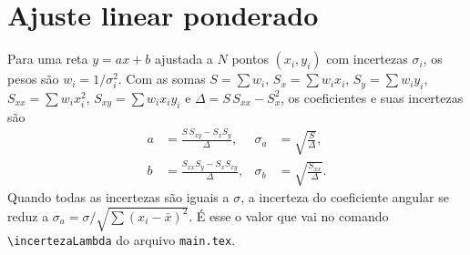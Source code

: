\chapter{Ajuste linear ponderado}
\label{ap:ajuste}

Para uma reta $y = a x + b$ ajustada a $N$ pontos $(x_i, y_i)$ com incertezas $\sigma_i$, os pesos são $w_i = 1/\sigma_i^2$. Com as somas $S = \sum w_i$, $S_x = \sum w_i x_i$, $S_y = \sum w_i y_i$, $S_{xx} = \sum w_i x_i^2$, $S_{xy} = \sum w_i x_i y_i$ e $\Delta = S\,S_{xx} - S_x^2$, os coeficientes e suas incertezas são \cite{taylor1997}
\begin{align}
  a &= \frac{S\,S_{xy} - S_x S_y}{\Delta}, & \sigma_a &= \sqrt{\frac{S}{\Delta}}, \\
  b &= \frac{S_{xx} S_y - S_x S_{xy}}{\Delta}, & \sigma_b &= \sqrt{\frac{S_{xx}}{\Delta}}.
\end{align}
Quando todas as incertezas são iguais a $\sigma$, a incerteza do coeficiente angular se reduz a $\sigma_a = \sigma / \sqrt{\sum (x_i - \bar{x})^2}$. É esse o valor que vai no comando \verb|\incertezaLambda| do arquivo \texttt{main.tex}.
